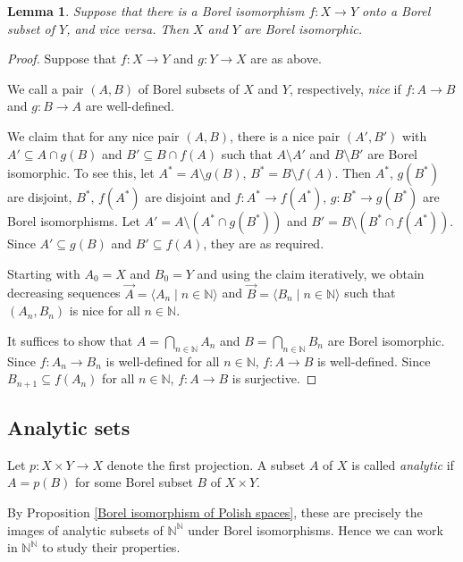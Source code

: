 \documentclass[10pt]{amsart}
\newcommand{\NN}{\mathbb{N}}
\newtheorem{lemma}[theorem]{Lemma}
\theoremstyle{definition}
\theoremstyle{remark}
\begin{document}
\begin{lemma} 
Suppose that there is a Borel isomorphism $f\colon X\rightarrow Y$ onto a Borel subset of $Y$, and vice versa. 
Then $X$ and $Y$ are Borel isomorphic. 
\end{lemma} 
\begin{proof} 
Suppose that $f\colon X\rightarrow Y$ and $g\colon Y\rightarrow X$ are as above. 

We call a pair $(A,B)$ of Borel subsets of $X$ and $Y$, respectively, \emph{nice} if $f\colon A\rightarrow B$ and $g\colon B\rightarrow A$ are well-defined. 

We claim that for any nice pair $(A,B)$, there is a nice pair $(A',B')$ with $A'\subseteq A\cap g(B)$ and $B'\subseteq B\cap f(A)$ such that $A\setminus A'$ and $B\setminus B'$ are Borel isomorphic. 
To see this, let $A^*=A\setminus g(B)$, $B^*=B\setminus f(A)$. 
Then $A^*$, $g(B^*)$ are disjoint, $B^*$, $f(A^*)$ are disjoint and $f\colon A^*\rightarrow f(A^*)$, $g\colon B^*\rightarrow g(B^*)$ are Borel isomorphisms. 
Let $A'=A\setminus (A^*\cap g(B^*))$ and $B'=B\setminus (B^*\cap f(A^*))$. Since $A'\subseteq g(B)$ and $B'\subseteq f(A)$, they are as required. 

Starting with $A_0=X$ and $B_0=Y$ and using the claim iteratively, we obtain decreasing sequences $\vec{A}=\langle A_n\mid n\in\NN\rangle$ and $\vec{B}=\langle B_n\mid n\in\NN\rangle$ such that $(A_n, B_n)$ is nice for all $n\in\NN$. 

It suffices to show that $A=\bigcap_{n\in\NN} A_n$ and $B=\bigcap_{n\in\NN}B_n$ are Borel isomorphic. 
Since $f\colon A_n\rightarrow B_n$ is well-defined for all $n\in\NN$, $f\colon A\rightarrow B$ is well-defined. 
Since $B_{n+1}\subseteq f(A_n)$ for all $n\in \NN$, $f\colon A\rightarrow B$ is surjective. 
\end{proof} 





\subsection{Analytic sets} 

Let $p\colon X\times Y\rightarrow X$ denote the first projection. 
A subset $A$ of $X$ is called \emph{analytic} if $A=p(B)$ for some Borel subset $B$ of $X\times Y$. 

By Proposition \ref{Borel isomorphism of Polish spaces}, these are precisely the images of analytic subsets of $\NN^\NN$ under Borel isomorphisms. 
Hence we can work in $\NN^\NN$ to study their properties. 
\end{document}
